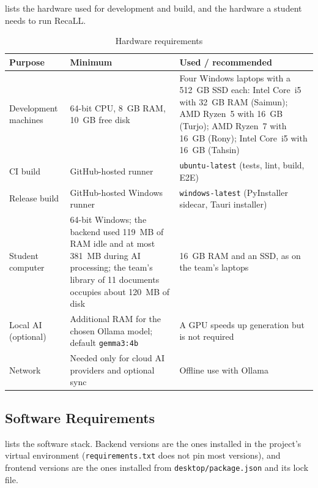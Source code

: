  lists the hardware used for development and build, and the hardware a student
needs to run RecaLL.

\begin{table}[htbp]
\centering
\caption{Hardware requirements}\label{tab:hw}
\small
\begin{tabularx}{\textwidth}{@{}>{\raggedright\arraybackslash}p{3.0cm} X X@{}}
\toprule
\textbf{Purpose} & \textbf{Minimum} & \textbf{Used / recommended}\\
\midrule
Development machines & 64-bit CPU, 8~GB RAM, 10~GB free disk & Four Windows laptops with a
512~GB SSD each: Intel Core~i5 with 32~GB RAM (Saimun); AMD Ryzen~5 with 16~GB (Turjo); AMD
Ryzen~7 with 16~GB (Rony); Intel Core~i5 with 16~GB (Tahsin)\\
CI build & GitHub-hosted runner & \texttt{ubuntu-latest} (tests, lint, build, E2E)\\
Release build & GitHub-hosted Windows runner & \texttt{windows-latest} (PyInstaller sidecar,
Tauri installer)\\
Student computer & 64-bit Windows; the backend used 119~MB of RAM idle and at most 381~MB
during AI processing; the team's library of 11 documents occupies about 120~MB of disk &
16~GB RAM and an SSD, as on the team's laptops\\
Local AI (optional) & Additional RAM for the chosen Ollama model; default
\texttt{gemma3:4b} & A GPU speeds up generation but is not required\\
Network & Needed only for cloud AI providers and optional sync & Offline use with Ollama\\
\bottomrule
\end{tabularx}
\end{table}

\subsection{Software Requirements}

 lists the software stack. Backend versions are the ones installed in the
project's virtual environment (\texttt{requirements.txt} does not pin most versions), and
frontend versions are the ones installed from \texttt{desktop/package.json} and its lock
file.

